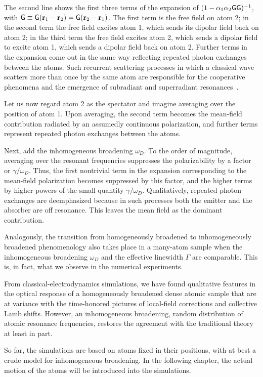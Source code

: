 The second line shows the first three terms of the expansion of $(1-\alpha_1\alpha_2{\sf G}{\sf G})^{-1}$, with ${\sf G}\equiv{\sf G}({\bf r}_1-{\bf r}_2)={\sf G}({\bf r}_2-{\bf r}_1)$. The first term is the free field on atom 2; in the second term the free field excites atom 1, which sends its dipolar field back on atom 2; in the third term the free field excites atom 2, which sends a dipolar field to excite atom 1, which sends a dipolar field back on atom 2. Further terms in the expansion come out in the same way reflecting repeated photon exchanges between the atoms. Such recurrent scattering processes in which a classical wave scatters more than once by the same atom are responsible for the cooperative phenomena and the emergence of subradiant and superradiant resonances~\cite{PhysRevA.55.513,PhysRevA.86.031602,PhysRevB.86.085116}.

Let us now regard atom 2 as the spectator and imagine averaging over the position of atom 1. Upon averaging, the second term becomes the mean-field contribution radiated by an assumedly continuous polarization, and further terms represent repeated photon exchanges between the atoms. 

Next, add the inhomogeneous broadening $\omega_D$. To the order of magnitude, averaging over the resonant frequencies suppresses the polarizability by a factor or $\gamma/\omega_D$. Thus, the first nontrivial term in the expansion corresponding to the mean-field polarization becomes suppressed by this factor, and the higher terms by higher powers of the small quantity $\gamma/\omega_D$. Qualitatively, repeated photon exchanges are deemphasized because in such processes both the emitter and the absorber are off resonance. This leaves the mean field as the dominant contribution.

Analogously, the transition from homogeneously broadened to inhomogeneously broadened phenomenology also takes place in a many-atom sample when the inhomogeneous broadening $\omega_D$ and the effective linewidth $\Gamma$ are comparable. This is, in fact, what we observe in the numerical experiments.

From classical-electrodynamics simulations, we have found qualitative features in the optical response of a homogeneously broadened dense atomic sample that are at variance with the time-honored pictures of local-field corrections and collective Lamb shifts. However, an inhomogeneous broadening, random distribution of atomic resonance frequencies, restores the agreement with the traditional theory at least in part.

So far, the simulations are based on atoms fixed in their positions, with at best a crude model for inhomogeneous broadening. In the following chapter, the actual motion of the atoms will be introduced into the simulations.

